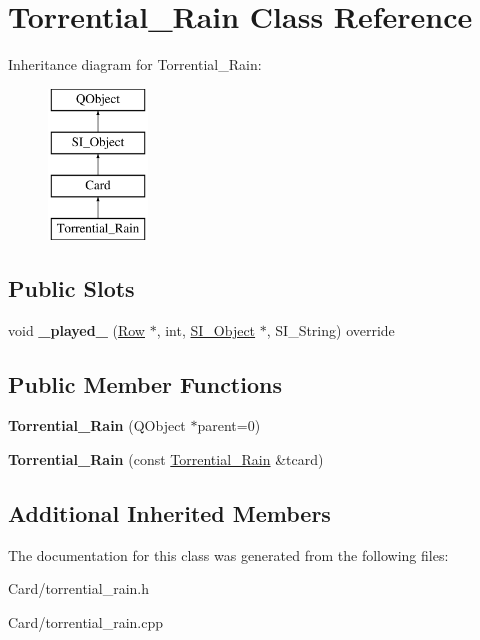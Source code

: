 \hypertarget{class_torrential___rain}{}\section{Torrential\+\_\+\+Rain Class Reference}
\label{class_torrential___rain}
Inheritance diagram for Torrential\+\_\+\+Rain\+:\begin{figure}[H]
\begin{center}
\leavevmode
\includegraphics[height=4.000000cm]{class_torrential___rain}
\end{center}
\end{figure}
\subsection*{Public Slots}
\begin{DoxyCompactItemize}
\item 
\mbox{\label{class_torrential___rain_a94c39f32d3a1039cf05bee7313808992}} 
void {\bfseries \+\_\+played\+\_\+} (\hyperlink{class_card_set}{Row} $\ast$, int, \hyperlink{class_s_i___object}{S\+I\+\_\+\+Object} $\ast$, S\+I\+\_\+\+String) override
\end{DoxyCompactItemize}
\subsection*{Public Member Functions}
\begin{DoxyCompactItemize}
\item 
\mbox{\label{class_torrential___rain_ae014e0ff12078577e7b20b4110504701}} 
{\bfseries Torrential\+\_\+\+Rain} (Q\+Object $\ast$parent=0)
\item 
\mbox{\label{class_torrential___rain_aeceaa1d90a1ab411359e614c86666d61}} 
{\bfseries Torrential\+\_\+\+Rain} (const \hyperlink{class_torrential___rain}{Torrential\+\_\+\+Rain} \&tcard)
\end{DoxyCompactItemize}
\subsection*{Additional Inherited Members}


The documentation for this class was generated from the following files\+:\begin{DoxyCompactItemize}
\item 
Card/torrential\+\_\+rain.\+h\item 
Card/torrential\+\_\+rain.\+cpp\end{DoxyCompactItemize}
